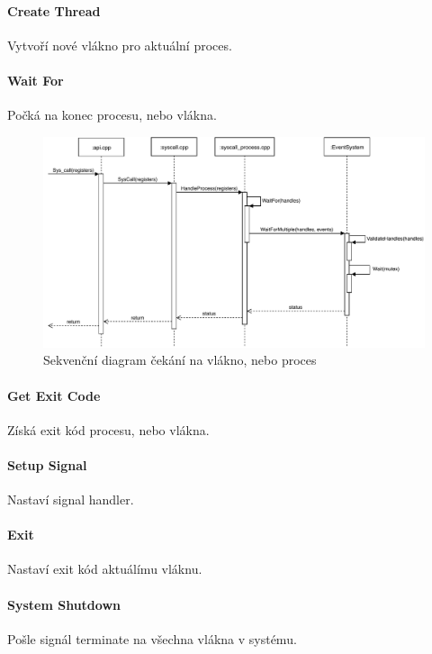 \documentclass[11pt,a4paper]{scrartcl}
\begin{document}
	\paragraph{Create Thread}
	Vytvoří nové vlákno pro aktuální proces.
	
	\paragraph{Wait For}
	Počká na konec procesu, nebo vlákna.
	
	\begin{figure}[H]
		\centering
		\includegraphics[width=14cm]{wait-for-proc.pdf}
		\caption{Sekvenční diagram čekání na vlákno, nebo proces}
		\label{fig:wait-for-proc}
	\end{figure}
	
	\paragraph{Get Exit Code}
	Získá exit kód procesu, nebo vlákna.
	
	\paragraph{Setup Signal}
	Nastaví signal handler.
	
	\paragraph{Exit}
	Nastaví exit kód aktuálímu vláknu.
	
	\paragraph{System Shutdown}
	Pošle signál terminate na všechna vlákna v systému.
\end{document}
